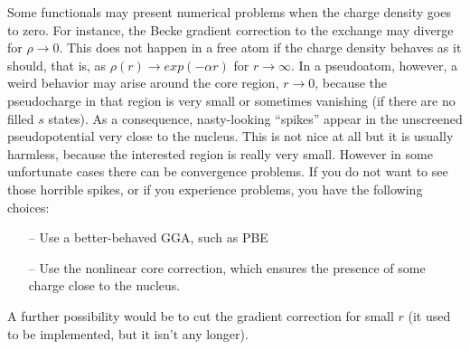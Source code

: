 \documentclass[12pt]{article}
\begin{document}
Some functionals may present numerical problems
when the charge density goes to zero. For instance, the Becke
gradient correction to the exchange may diverge for 
$\rho \rightarrow 0$. This does not happen in a free atom
if the charge density behaves as it should, that is, as
$\rho(r)\rightarrow exp(-\alpha r)$ for $r \rightarrow \infty$.
In a pseudoatom, however, a weird behavior may arise 
around the core region, $r\rightarrow 0$, because the 
pseudocharge in that region is very small or sometimes 
vanishing (if there are no filled $s$ states). As a consequence,
nasty-looking ``spikes'' appear in the unscreened pseudopotential
very close to the nucleus. This is not nice at all but it is
usually harmless, because the interested region is really 
very small. However in some unfortunate cases there can be 
convergence problems. If you do not want to see those horrible 
spikes, or if you experience problems, you have the following
choices:
\begin{enumerate}
\item[--] Use a better-behaved GGA, such as PBE
\item[--] Use the nonlinear core correction, which ensures
          the presence of some charge close to the nucleus.
\end{enumerate}
A further possibility would be to cut the gradient correction for small 
$r$ (it used to be implemented, but it isn't any longer).
\end{document}
